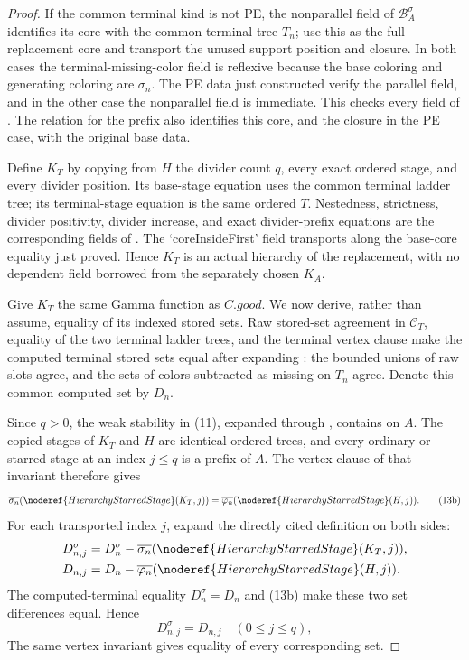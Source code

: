 \begin{proof}
If the common terminal kind is not PE, the nonparallel field of
$\mathcal B_A^\sigma$ identifies its core with the common terminal tree
$T_n$; use this as the full replacement core and transport the unused
support position and closure.  In both cases the terminal-missing-color
field is reflexive because the base coloring and generating coloring are
$\sigma_n$.  The PE data just constructed verify the parallel field,
and in the other case the nonparallel field is immediate.  This checks
every field of .  The
 relation for the prefix also identifies this
core, and the closure in the PE case, with the original base data.

Define $K_T$ by copying from $H$ the divider count $q$, every exact
ordered stage, and every divider position.  Its base-stage equation uses
the common terminal ladder tree; its terminal-stage equation is the
same ordered $T$.  Nestedness, strictness, divider positivity,
divider increase, and exact divider-prefix equations are the
corresponding fields of .  The
`coreInsideFirst' field transports along the base-core equality just
proved.  Hence $K_T$ is an actual hierarchy of the replacement, with no
dependent field borrowed from the separately chosen $K_A$.

Give $K_T$ the same Gamma function as $C.\mathit{good}$.  We now derive,
rather than assume, equality of its indexed stored sets.  Raw stored-set
agreement in $\mathcal C_T$, equality of the two terminal ladder trees,
and the terminal  vertex clause make the
computed terminal stored sets equal after expanding
: the bounded unions of raw slots agree,
and the sets of colors subtracted as missing on $T_n$ agree.  Denote this
common computed set by $D_n$.

Since $q>0$, the weak stability in (11), expanded through
, contains
 on $A$.  The copied stages of $K_T$ and
$H$ are identical ordered trees, and every ordinary or starred stage at
an index $j\leq q$ is a prefix of $A$.  The vertex clause of that
invariant therefore gives
\[
 \overline{\sigma_n}(\noderef{HierarchyStarredStage}(K_T,j))
 =\overline{\varphi_n}(\noderef{HierarchyStarredStage}(H,j)). \tag{13b}
\]
For each transported index $j$, expand the directly cited definition
 on both sides:
\[
 \begin{aligned}
 D^\sigma_{n,j}
   &=D_n^\sigma-
     \overline{\sigma_n}(\noderef{HierarchyStarredStage}(K_T,j)),\\
 D_{n,j}
   &=D_n-
     \overline{\varphi_n}(\noderef{HierarchyStarredStage}(H,j)).
 \end{aligned}
\]
The computed-terminal equality $D_n^\sigma=D_n$ and (13b) make these
two set differences equal.  Hence
\[
 D^\sigma_{n,j}=D_{n,j}\quad(0\leq j\leq q),                 \tag{14}
\]
The same vertex invariant gives equality of every corresponding
 set.


\end{proof}
